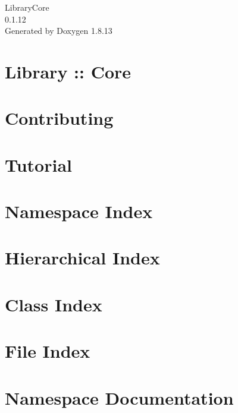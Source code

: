 \documentclass[twoside]{book}
\newcommand{\+}{\discretionary{\mbox{\scriptsize$\hookleftarrow$}}{}{}}
\newcommand{\clearemptydoublepage}{%
  \newpage{\pagestyle{empty}\cleardoublepage}%
}
\begin{document}
\hypersetup{pageanchor=false,
             bookmarksnumbered=true,
             pdfencoding=unicode
            }
\begin{titlepage}
\vspace*{7cm}
\begin{center}%
{\Large Library\+Core \\[1ex]\large 0.\+1.\+12 }\\
\vspace*{1cm}
{\large Generated by Doxygen 1.8.13}\\
\end{center}
\end{titlepage}
\clearemptydoublepage
{}
\tableofcontents
\clearemptydoublepage
{}
\hypersetup{pageanchor=true}

\chapter{Library \+:\+: Core}
\label{index}\hypertarget{index}{}
\chapter{Contributing}
\label{md__c_o_n_t_r_i_b_u_t_i_n_g}

\chapter{Tutorial}
\label{md_docs__tutorial}

\chapter{Namespace Index}

\chapter{Hierarchical Index}

\chapter{Class Index}

\chapter{File Index}

\chapter{Namespace Documentation}














\end{document}
